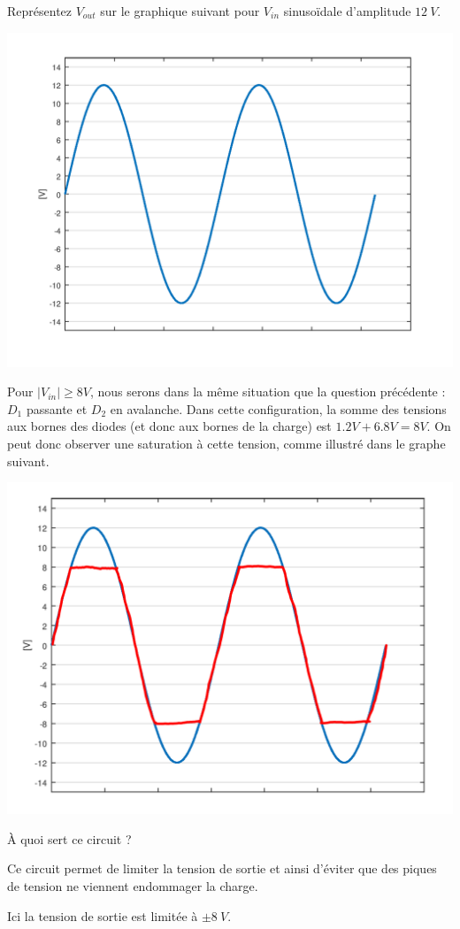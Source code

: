\documentclass{../template/tp}
\begin{document}
\Question
{
    Représentez $ V_{out} $ sur le graphique suivant pour  $ V_{in} $ sinusoïdale d'amplitude $ 12~V $.
    
    \includegraphics[width=.8\textwidth]{sinus.png}
    

}{

    Pour $|V_{in}| \geq 8V$, nous serons dans la même situation que la question précédente : $D_1$ passante et $D_2$ en avalanche.
    Dans cette configuration, la somme des tensions aux bornes des diodes (et donc aux bornes de la charge) est $1.2 V + 6.8 V = 8 V$.
    On peut donc observer une saturation à cette tension, comme illustré dans le graphe suivant.

    \begin{center}
    \includegraphics[width=.8\textwidth]{sinus_correction.png}
    \end{center}
}

\Question
{
    À quoi sert ce circuit ?
}{
    Ce circuit permet de limiter la tension de sortie et ainsi d'éviter que des piques de tension ne viennent endommager la charge.
    
    Ici la tension de sortie est limitée à $ \pm 8~V $.
}
\end{document}

